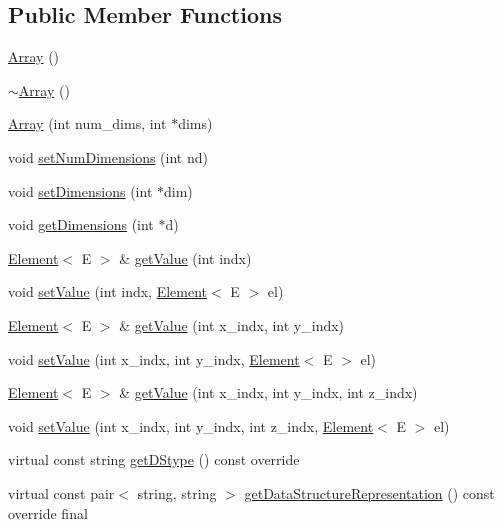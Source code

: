 \subsection*{Public Member Functions}
\begin{DoxyCompactItemize}
\item 
\hyperlink{classbridges_1_1_array_a958421b86ff55303b5fc7d505109f9fe}{Array} ()
\item 
\hyperlink{classbridges_1_1_array_abfca49c36c2b6c63c88010df50f5f49c}{$\sim$\+Array} ()
\item 
\hyperlink{classbridges_1_1_array_a25ff771f9ba7f365465f309ed2dd3688}{Array} (int num\+\_\+dims, int $\ast$dims)
\item 
void \hyperlink{classbridges_1_1_array_a6b91612bb7b89a563571fd1ea417ef2a}{set\+Num\+Dimensions} (int nd)
\item 
void \hyperlink{classbridges_1_1_array_a4e179915ab7820bbafe9b3433656b182}{set\+Dimensions} (int $\ast$dim)
\item 
void \hyperlink{classbridges_1_1_array_ae195a6f06157e82c68483ff636e30f5e}{get\+Dimensions} (int $\ast$d)
\item 
\hyperlink{classbridges_1_1_element}{Element}$<$ E $>$ \& \hyperlink{classbridges_1_1_array_a307586edf2efc143878bdff0ac14df1f}{get\+Value} (int indx)
\item 
void \hyperlink{classbridges_1_1_array_a7686d816d6118cf05da7f047c8d7f065}{set\+Value} (int indx, \hyperlink{classbridges_1_1_element}{Element}$<$ E $>$ el)
\item 
\hyperlink{classbridges_1_1_element}{Element}$<$ E $>$ \& \hyperlink{classbridges_1_1_array_afb68e42d59a369922a95bfdd7efbaef5}{get\+Value} (int x\+\_\+indx, int y\+\_\+indx)
\item 
void \hyperlink{classbridges_1_1_array_a3a6ef57159e7b50d4e3eb1899fd1090f}{set\+Value} (int x\+\_\+indx, int y\+\_\+indx, \hyperlink{classbridges_1_1_element}{Element}$<$ E $>$ el)
\item 
\hyperlink{classbridges_1_1_element}{Element}$<$ E $>$ \& \hyperlink{classbridges_1_1_array_a1511664b75c650f7baad3920578f5153}{get\+Value} (int x\+\_\+indx, int y\+\_\+indx, int z\+\_\+indx)
\item 
void \hyperlink{classbridges_1_1_array_a50ac708525644bbd81ea21221a1fefc5}{set\+Value} (int x\+\_\+indx, int y\+\_\+indx, int z\+\_\+indx, \hyperlink{classbridges_1_1_element}{Element}$<$ E $>$ el)
\item 
virtual const string \hyperlink{classbridges_1_1_array_afe4174bc21eaafa316584894cf4732b1}{get\+D\+Stype} () const  override
\item 
virtual const pair$<$ string, string $>$ \hyperlink{classbridges_1_1_array_adc13651f1b228d222772e2f5df16229b}{get\+Data\+Structure\+Representation} () const  override final
\end{DoxyCompactItemize}
